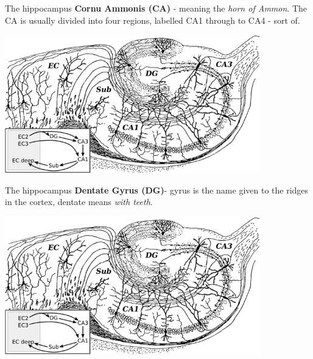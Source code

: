 \documentclass{beamer}
\begin{document}
\begin{frame}{The hippocampus}
\color{red}\textbf{Cornu Ammonis (CA)} - meaning the \textsl{horn of Ammon}. The CA is usually divided
  into four regions, labelled CA1 through to CA4 - sort of.\color{black}
  \begin{center}
    \includegraphics[height=6cm]{hippocampus.png}
  \end{center}
      \vfill
\end{frame}


\begin{frame}{The hippocampus}
\color{red}\textbf{Dentate Gyrus (DG)}- gyrus is the name given to the ridges in the
  cortex, dentate means \textsl{with teeth}.\color{black}
  \begin{center}
    \includegraphics[height=6cm]{hippocampus.png}
  \end{center}
      \vfill
\end{frame}
\end{document}
